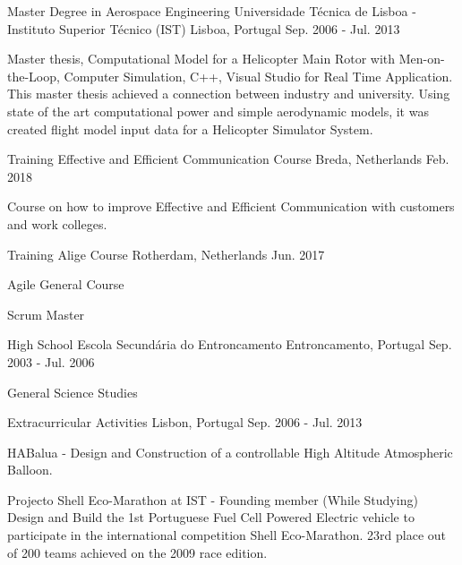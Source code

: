 \begin{cventries}
  \cventry
    {Master Degree in Aerospace Engineering}
    {Universidade Técnica de Lisboa - Instituto Superior Técnico (IST)}
    {Lisboa, Portugal}
    {Sep. 2006 - Jul. 2013}
    {
      \begin{cvitems}
        \item {Master thesis, Computational Model for a Helicopter Main Rotor with Men-on-the-Loop, Computer Simulation, C++, Visual Studio for Real Time Application. 
This master thesis achieved a connection between industry and university. Using state of the art computational power and simple aerodynamic models, it was created flight model input data for a Helicopter Simulator System.
}
      \end{cvitems}
    }
    
    \cventry
    {Training}
    {Effective and Efficient Communication Course}
    {Breda, Netherlands}
    {Feb. 2018}
    {  \begin{cvitems}
        \item Course on how to improve Effective and Efficient Communication with customers and work colleges.
        \end{cvitems}
  }
  
    \cventry
    {Training}
    {Alige Course}
    {Rotherdam, Netherlands}
    {Jun. 2017}
    {  \begin{cvitems}
        \item Agile General Course
        \item Scrum Master
        \end{cvitems}
  }
  
     \cventry
    {High School}
    {Escola Secundária do Entroncamento}
    {Entroncamento, Portugal}
    {Sep. 2003 - Jul. 2006}
    {
      \begin{cvitems}
        \item {General Science Studies}
      \end{cvitems}
    }
    
   \cventry
    {}
    {Extracurricular Activities}
    {Lisbon, Portugal}
    {Sep. 2006 - Jul. 2013}
    {
      \begin{cvitems}
    \item {HABalua - Design and Construction of a controllable High Altitude Atmospheric Balloon.}
    \item {Projecto Shell Eco-Marathon at IST - Founding member (While Studying) Design and Build the 1st Portuguese Fuel Cell Powered Electric vehicle to participate in the international competition Shell Eco-Marathon. 23rd place out of 200 teams achieved on the 2009 race edition.} 
      \end{cvitems}
    }
\end{cventries}

